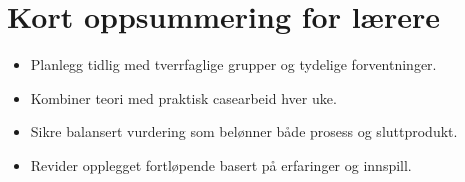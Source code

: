 \section{Kort oppsummering for lærere}
\begin{itemize}
    \item Planlegg tidlig med tverrfaglige grupper og tydelige forventninger.
    \item Kombiner teori med praktisk casearbeid hver uke.
    \item Sikre balansert vurdering som belønner både prosess og sluttprodukt.
    \item Revider opplegget fortløpende basert på erfaringer og innspill.
\end{itemize}

